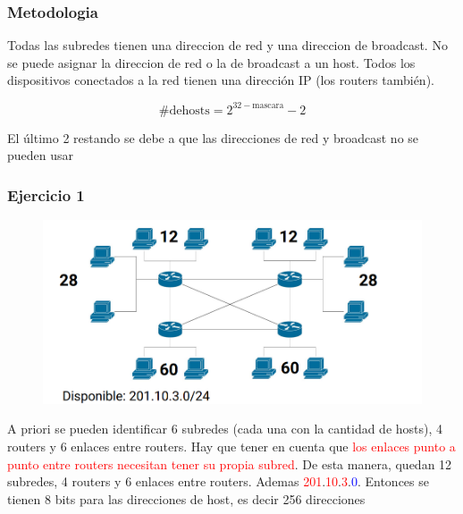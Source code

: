 \subsubsection{Metodologia}
Todas las subredes tienen una direccion de red y una direccion de broadcast. No se puede asignar la direccion de red o la de broadcast a un host. Todos los dispositivos conectados a la red tienen una dirección IP (los routers también).

$$ \mathrm{\# de hosts} = 2^{32-\mathrm{mascara}}-2 $$ 

El último 2 restando se debe a que las direcciones de red y broadcast no se pueden usar

\subsubsection{Ejercicio 1}

\begin{figure}[H]
\centering
\includegraphics[width=\textwidth]{imagenes/enunciado1subnetting.png}
\end{figure}

A priori se pueden identificar 6 subredes (cada una con la cantidad de hosts), 4 routers y 6 enlaces entre routers. Hay que tener en cuenta que \textcolor{red}{los enlaces punto a punto entre routers necesitan tener su propia subred}. De esta manera, quedan 12 subredes, 4 routers y 6 enlaces entre routers. Ademas \textcolor{red}{201}.\textcolor{red}{10}.\textcolor{red}{3}.\textcolor{blue}{0}. Entonces se tienen 8 bits para las direcciones de host, es decir 256 direcciones

